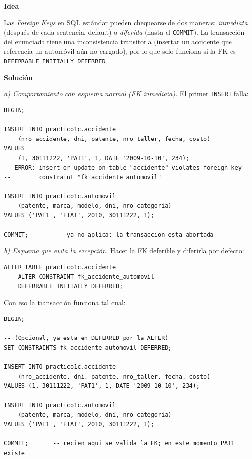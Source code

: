 \documentclass[11pt,a4paper]{article}
\newcommand{\itemcabecera}[1]{\noindent\textbf{#1}\par\medskip}
\newcommand{\bloqueIdea}{\itemcabecera{Idea}}
\newcommand{\bloqueSolucion}{\itemcabecera{Soluci\'on}}
\begin{document}
\bloqueIdea

Las \emph{Foreign Keys} en SQL estándar pueden chequearse de dos maneras: \emph{inmediata} (después de cada sentencia, default) o \emph{diferida} (hasta el \texttt{COMMIT}). La transacción del enunciado tiene una inconsistencia transitoria (insertar un accidente que referencia un automóvil aún no cargado), por lo que solo funciona si la FK es \texttt{DEFERRABLE INITIALLY DEFERRED}.

\bloqueSolucion

\textit{a) Comportamiento con esquema normal (FK inmediata).} El primer \texttt{INSERT} falla:

\begin{lstlisting}
BEGIN;

INSERT INTO practico1c.accidente
    (nro_accidente, dni, patente, nro_taller, fecha, costo)
VALUES
    (1, 30111222, 'PAT1', 1, DATE '2009-10-10', 234);
-- ERROR: insert or update on table "accidente" violates foreign key
--        constraint "fk_accidente_automovil"

INSERT INTO practico1c.automovil
    (patente, marca, modelo, dni, nro_categoria)
VALUES ('PAT1', 'FIAT', 2010, 30111222, 1);

COMMIT;        -- ya no aplica: la transaccion esta abortada
\end{lstlisting}

\textit{b) Esquema que evita la excepción.} Hacer la FK deferible y diferirla por defecto:

\begin{lstlisting}
ALTER TABLE practico1c.accidente
    ALTER CONSTRAINT fk_accidente_automovil
    DEFERRABLE INITIALLY DEFERRED;
\end{lstlisting}

Con eso la transacción funciona tal cual:

\begin{lstlisting}
BEGIN;

-- (Opcional, ya esta en DEFERRED por la ALTER)
SET CONSTRAINTS fk_accidente_automovil DEFERRED;

INSERT INTO practico1c.accidente
    (nro_accidente, dni, patente, nro_taller, fecha, costo)
VALUES (1, 30111222, 'PAT1', 1, DATE '2009-10-10', 234);

INSERT INTO practico1c.automovil
    (patente, marca, modelo, dni, nro_categoria)
VALUES ('PAT1', 'FIAT', 2010, 30111222, 1);

COMMIT;       -- recien aqui se valida la FK; en este momento PAT1 existe
\end{lstlisting}
\end{document}
